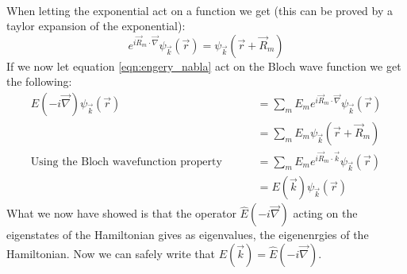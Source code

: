 \begin{myproof}
\begin{align}
	\end{align}
	When letting the exponential act on a function we get (this can be proved by a taylor expansion of the exponential):
	\begin{equation}
		e^{i\vec{R}_m\cdot\vec{\nabla}}\psi_{\vec{k}}(\vec{r}) = \psi_{\vec{k}}(\vec{r} + \vec{R}_m)
	\end{equation}
	If we now let equation \ref{eqn:engery_nabla} act on the Bloch wave function we get the following:
	\begin{align}
		\hat{E}(-i\vec{\nabla})\psi_{\vec{k}}(\vec{r}) &= \sum_m^{}E_me^{i\vec{R}_m\cdot\vec{\nabla}}\psi_{\vec{k}}(\vec{r}) \\
		&= \sum_m^{}E_m\psi_{\vec{k}}(\vec{r} + \vec{R}_m) \\
		\text{Using the Bloch wavefunction property }	\qquad &= \sum_m^{}E_me^{i\vec{R}_m\cdot\vec{k}}\psi_{\vec{k}}(\vec{r}) \\
		&= E(\vec{k})\psi_{\vec{k}}(\vec{r})
	\end{align}
	What we now have showed is that the operator $\hat{E}(-i\vec{\nabla})$ acting on the eigenstates of the Hamiltonian gives as eigenvalues, the eigenenrgies of the Hamiltonian. Now we can safely write that $E(\vec{k}) = \hat{E}(-i\vec{\nabla})$.
\end{myproof}
